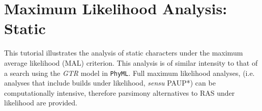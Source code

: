 


\section{Maximum Likelihood Analysis: Static}{\label{tutorial14}}

This tutorial illustrates the analysis of static characters under the maximum average likelihood (MAL) criterion.  
This analysis is of similar intensity to that of a search using the \emph{GTR} model in \texttt{PhyML}.  
Full maximum likelihood analyses, (i.e. analyses that include builds under likelihood, \textit{sensu} PAUP*) 
can be computationally intensive, therefore parsimony alternatives to RAS under likelihood are provided. 

